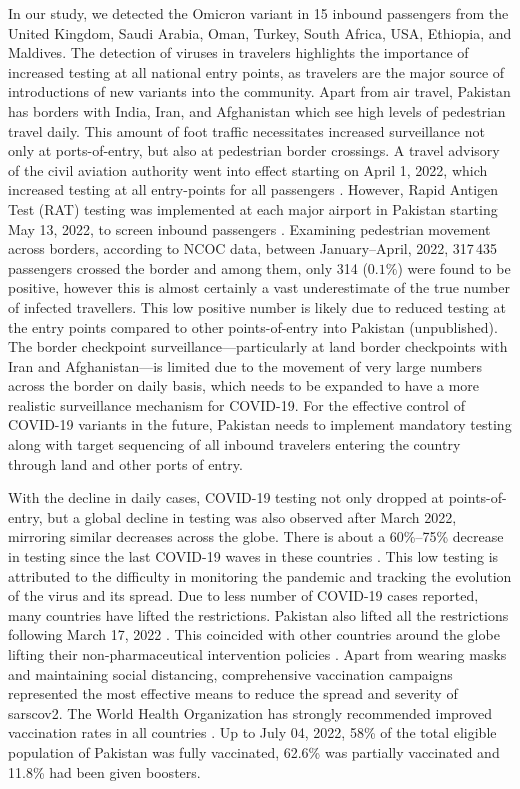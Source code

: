 In our study, we detected the Omicron variant in 15 inbound passengers from the United Kingdom, Saudi Arabia, Oman, Turkey, South Africa, USA, Ethiopia, and Maldives.
The detection of viruses in travelers highlights the importance of increased testing at all national entry points, as travelers are the major source of introductions of new variants into the community.
Apart from air travel, Pakistan has borders with India, Iran, and Afghanistan which see high levels of pedestrian travel daily.
This amount of foot traffic necessitates increased surveillance not only at ports-of-entry, but also at pedestrian border crossings.
A travel advisory of the civil aviation authority went into effect starting on April 1, 2022, which increased testing at all entry-points for all passengers \citep{caapakistan-covid-guidelines}.
However, Rapid Antigen Test (RAT) testing was implemented at each major airport in Pakistan starting May 13, 2022, to screen inbound passengers \citep{brecorder-inbound-flights}.
Examining pedestrian movement across borders, according to NCOC data, between January--April, 2022, 317\,435 passengers crossed the border and among them, only 314 ($0.1\%$) were found to be positive, however this is almost certainly a vast underestimate of the true number of infected travellers.
This low positive number is likely due to reduced testing at the entry points compared to other points-of-entry into Pakistan (unpublished).
The border checkpoint surveillance---particularly at land border checkpoints with Iran and Afghanistan---is limited due to the movement of very large numbers across the border on daily basis, which needs to be expanded to have a more realistic surveillance mechanism for COVID-19.
For the effective control of COVID-19 variants in the future, Pakistan needs to implement mandatory testing along with target sequencing of all inbound travelers entering the country through land and other ports of entry.

With the decline in daily cases, COVID-19 testing not only dropped at points-of-entry, but a global decline in testing was also observed after March 2022, mirroring similar decreases across the globe.
There is about a 60\%--75\% decrease in testing since the last COVID-19 waves in these countries \citep{ourworldindata-covid-explorer}.
This low testing is attributed to the difficulty in monitoring the pandemic and tracking the evolution of the virus and its spread.
Due to less number of COVID-19 cases reported, many countries have lifted the restrictions.
Pakistan also lifted all the restrictions following March 17, 2022 \citep{business-standard-covid-curbs}.
This coincided with other countries around the globe lifting their non-pharmaceutical intervention policies \citep{cdc-mask-travel-guidance}.
Apart from wearing masks and maintaining social distancing, comprehensive vaccination campaigns represented the most effective means to reduce the spread and severity of \gls{sarscov2}.
The World Health Organization has strongly recommended improved vaccination rates in all countries \citep{who-covid19-vaccine-advice}.
Up to July 04, 2022, 58\% of the total eligible population of Pakistan was fully vaccinated, 62.6\% was partially vaccinated and 11.8\% had been given boosters.

